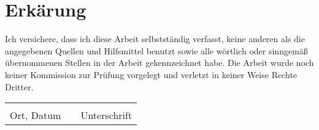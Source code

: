 \chapter*{Erkärung}

Ich versichere, dass ich diese Arbeit selbstständig verfasst, keine anderen als die angegebenen Quellen und Hilfsmittel benutzt sowie alle wörtlich oder sinngemäß übernommenen Stellen in der Arbeit gekennzeichnet habe. Die Arbeit wurde noch keiner Kommission zur Prüfung vorgelegt und verletzt in keiner Weise Rechte Dritter.

\vspace{5cm}





\begin{tabular}{lp{2em}l} 
	\hspace{8cm}   && \hspace{4cm} \\\cline{1-1}\cline{3-3} 
	Ort, Datum     && Unterschrift 
\end{tabular} 
